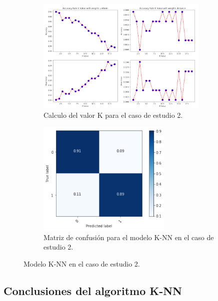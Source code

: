 \begin{figure}[!htb]
    \begin{subfigure}[b]{0.45\linewidth}
    	\centering
	    \includegraphics[width=0.9\textwidth]{images/resultados_knn_ent_conjunto2.png}
    	\caption{Calculo del valor K para el caso de estudio 2.}
		\label{knnTrainCase2}
	\end{subfigure}
	\begin{subfigure}[b]{0.45\linewidth} 
		\centering
		\includegraphics[width=0.7\textwidth]{images/resultados_knn_cm_conjunto2.png}
		\caption{Matriz de confusión para el modelo K-NN en el caso de estudio 2.}
		\label{knnCMCase2}
	\end{subfigure}
	\caption{Modelo K-NN en el caso de estudio 2.}
	\label{knnCase1}
\end{figure}

\subsection{Conclusiones del algoritmo K-NN}
\label{resultados:knn_conclusiones}

